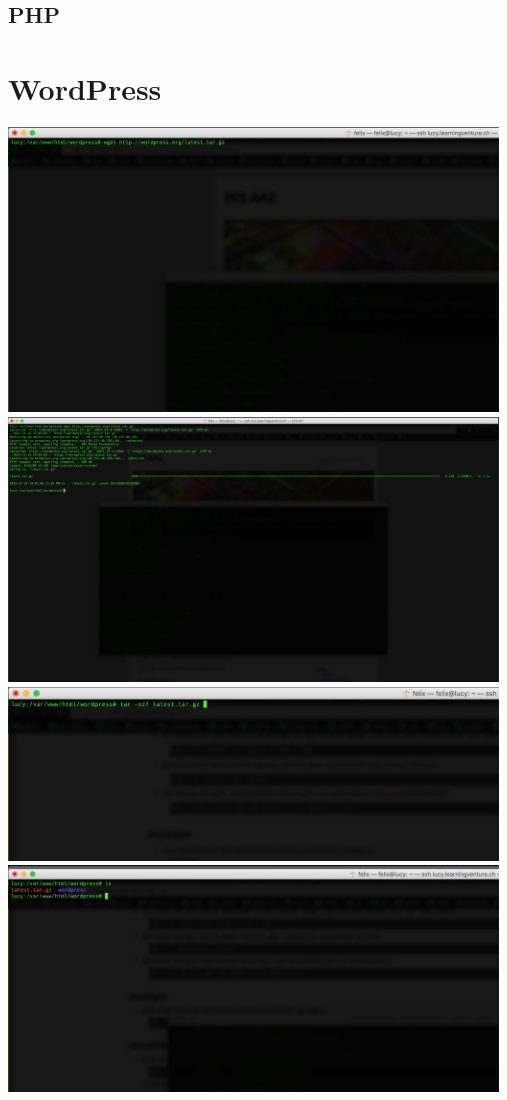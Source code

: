 \documentclass{article}
\begin{document}
	\subsection{PHP}
	\section{WordPress}
	\includegraphics[width=13cm]{../Pics/30-wordpress-download}
	\newline
	\includegraphics[width=13cm]{../Pics/31-wordpress-download-success}
	\newline
	\includegraphics[width=13cm]{../Pics/32-wordpress-unzip}
	\newline
	\includegraphics[width=13cm]{../Pics/33-wordpress-unzip-success}
\end{document}
